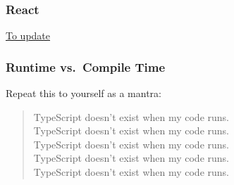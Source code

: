 \documentclass[aspectratio=169]{beamer}
\begin{document}
\begin{frame}
  \frametitle{React}

  \href{https://codesandbox.io/s/exciting-pond-9t0zh}{To update} \\
\end{frame}

\begin{frame}
  \frametitle{Runtime vs.\ Compile Time}

  Repeat this to yourself as a mantra: \\

  \begin{quote}
    TypeScript doesn't exist when my code runs. \\
    TypeScript doesn't exist when my code runs. \\
    TypeScript doesn't exist when my code runs. \\
    TypeScript doesn't exist when my code runs. \\
    TypeScript doesn't exist when my code runs.
  \end{quote}


\end{frame}
\end{document}
